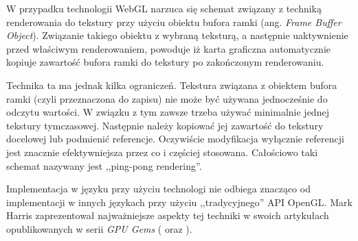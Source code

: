 W przypadku technologii WebGL narzuca się schemat związany z techniką
renderowania do tekstury przy użyciu obiektu bufora ramki (ang. \emph{Frame
Buffer Object}). Związanie takiego obiektu z wybraną teksturą, a następnie
uaktywnienie przed właściwym renderowaniem, powoduje iż karta graficzna
automatycznie kopiuje zawartość bufora ramki do tekstury po zakończonym
renderowaniu.

Technika ta ma jednak kilka ograniczeń. Tekstura związana z obiektem bufora
ramki (czyli przeznaczona do zapisu) nie może być używana jednocześnie do
odczytu wartości. W związku z tym zawsze trzeba używać minimalnie jednej
tekstury tymczasowej. Następnie należy kopiować jej zawartość do tekstury
docelowej lub podmienić referencje. Oczywiście modyfikacja wyłącznie
referencji  jest znacznie efektywniejsza przez co i częściej stosowana.
Całościowo taki schemat nazywany jest ,,ping-pong rendering''.

Implementacja w języku  przy użyciu technologi  nie
odbiega znacząco od implementacji w innych językach przy użyciu
,,tradycyjnego'' API OpenGL. Mark Harris zaprezentował najważniejsze aspekty
tej techniki w swoich artykułach opublikowanych w serii \emph{GPU Gems}
(\cite{GPUConcepts} oraz \cite{GPUFluid}).
